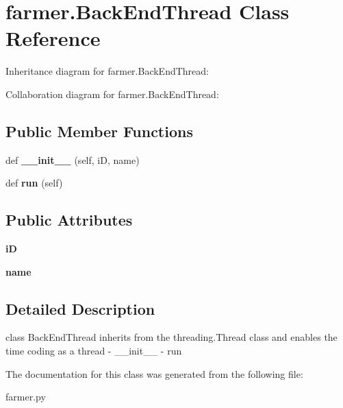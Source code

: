 \hypertarget{classfarmer_1_1BackEndThread}{}\section{farmer.\+Back\+End\+Thread Class Reference}
\label{classfarmer_1_1BackEndThread}


Inheritance diagram for farmer.\+Back\+End\+Thread\+:


Collaboration diagram for farmer.\+Back\+End\+Thread\+:
\subsection*{Public Member Functions}
\begin{DoxyCompactItemize}
\item 
\mbox{\label{classfarmer_1_1BackEndThread_ad1c5a730794baf5e143a563e72df6477}} 
def {\bfseries \+\_\+\+\_\+init\+\_\+\+\_\+} (self, iD, name)
\item 
\mbox{\label{classfarmer_1_1BackEndThread_a3bfb30250cd0c32f003ddf3952c244e9}} 
def {\bfseries run} (self)
\end{DoxyCompactItemize}
\subsection*{Public Attributes}
\begin{DoxyCompactItemize}
\item 
\mbox{\label{classfarmer_1_1BackEndThread_a6c0b260839646b00a8f030e8c7fa8b40}} 
{\bfseries iD}
\item 
\mbox{\label{classfarmer_1_1BackEndThread_a032ec4fbd5810275682616b9a99f38c2}} 
{\bfseries name}
\end{DoxyCompactItemize}


\subsection{Detailed Description}
\begin{DoxyVerb}class BackEndThread inherits from the threading.Thread class and enables the time coding as a thread
    - __init__
    - run
\end{DoxyVerb}
 

The documentation for this class was generated from the following file\+:\begin{DoxyCompactItemize}
\item 
farmer.\+py\end{DoxyCompactItemize}
